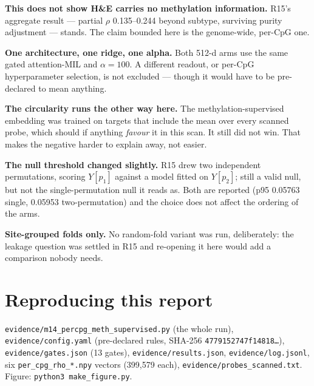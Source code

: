 \documentclass[11pt,a4paper]{article}
\begin{document}
\textbf{This does not show H\&E carries no methylation information.} R15's aggregate result ---
partial $\rho$ 0.135--0.244 beyond subtype, surviving purity adjustment --- stands. The claim
bounded here is the genome-wide, per-CpG one.

\textbf{One architecture, one ridge, one alpha.} Both 512-d arms use the same gated attention-MIL
and $\alpha = 100$. A different readout, or per-CpG hyperparameter selection, is not excluded ---
though it would have to be pre-declared to mean anything.

\textbf{The circularity runs the other way here.} The methylation-supervised embedding was trained
on targets that include the mean over every scanned probe, which should if anything \emph{favour}
it in this scan. It still did not win. That makes the negative harder to explain away, not easier.

\textbf{The null threshold changed slightly.} R15 drew two independent permutations, scoring
$Y[p_1]$ against a model fitted on $Y[p_2]$; still a valid null, but not the single-permutation
null it reads as. Both are reported (p95 0.05763 single, 0.05953 two-permutation) and the choice
does not affect the ordering of the arms.

\textbf{Site-grouped folds only.} No random-fold variant was run, deliberately: the leakage
question was settled in R15 and re-opening it here would add a comparison nobody needs.

\section*{Reproducing this report}

\texttt{evidence/m14\_percpg\_meth\_supervised.py} (the whole run),
\texttt{evidence/config.yaml} (pre-declared rules, SHA-256
\texttt{4779152747f14818\ldots}), \texttt{evidence/gates.json} (13 gates),
\texttt{evidence/results.json}, \texttt{evidence/log.jsonl},
six \texttt{per\_cpg\_rho\_*.npy} vectors (399{,}579 each),
\texttt{evidence/probes\_scanned.txt}. Figure: \texttt{python3 make\_figure.py}.
\end{document}
